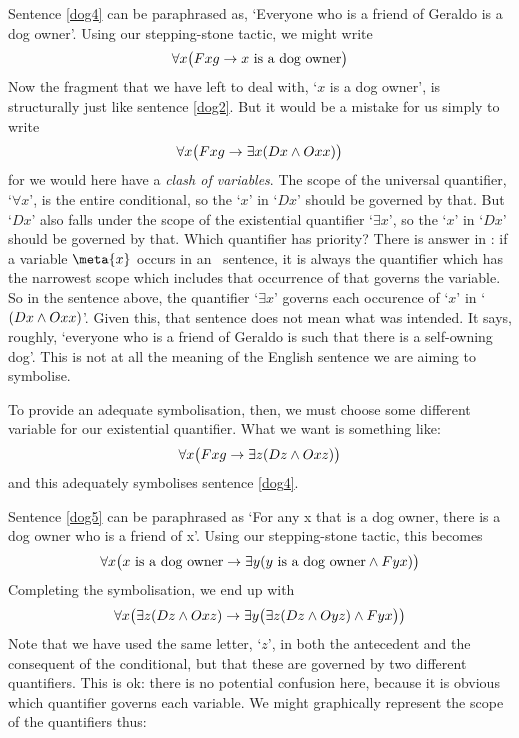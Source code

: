 Sentence \ref{dog4} can be paraphrased as, `Everyone who is a friend of Geraldo is a dog owner'. Using our stepping-stone tactic, we might write 
$$\forall x \bigl(Fxg \rightarrow x \text{ is a dog owner}\bigr)$$
Now the fragment that we have left to deal with, `$x$ is a dog owner', is structurally just like sentence \ref{dog2}. But it would be a mistake for us simply to write 
$$\forall x \bigl(Fxg \rightarrow \exists x(Dx \wedge Oxx) \bigr)$$
for we would here have a \emph{clash of variables}. The scope of the universal quantifier, `$\forall x$', is the entire conditional, so the `$x$' in `$Dx$' should be governed by that. But `$Dx$' also falls under the scope of the existential quantifier `$\exists x$', so the `$x$' in `$Dx$' should be governed by that. Which quantifier has priority? There is answer in \FOL: if a variable $\meta{x}$ occurs in an \FOL\ sentence, it is always the quantifier which has the narrowest scope which includes that occurrence of  that governs the variable. So in the sentence above, the quantifier `$\exists x$' governs each occurence of `$x$' in `$(Dx \wedge Oxx)$'. Given this, that sentence does not mean what was intended. It says, roughly, `everyone who is a friend of Geraldo is such that there is a self-owning dog'. This is not at all the meaning of the English sentence we are aiming to symbolise.



To provide an adequate symbolisation, then, we must choose some different variable for our existential quantifier. What we want is something like:
$$\forall x\bigl(Fxg \rightarrow\exists z(Dz \wedge Oxz) \bigr)$$
and this adequately symbolises sentence \ref{dog4}.

Sentence \ref{dog5} can be paraphrased as `For any x that is a dog owner, there is a dog owner who is a friend of x'. Using our stepping-stone tactic, this becomes 
$$\forall x\bigl(\mbox{$x$ is a dog owner}\rightarrow\exists y(\mbox{$y$ is a dog owner}\wedge Fyx) \bigr)$$
Completing the symbolisation, we end up with
$$\forall x\bigl(\exists z(Dz \wedge Oxz)\rightarrow\exists y\bigl(\exists z(Dz \wedge Oyz)\wedge Fyx\bigr) \bigr)$$
Note that we have used the same letter, `$z$', in both the antecedent and the consequent of the conditional, but that these are governed by two different quantifiers. This is ok: there is no potential confusion here, because it is obvious which quantifier governs each variable. We might graphically represent the scope of the quantifiers thus:


